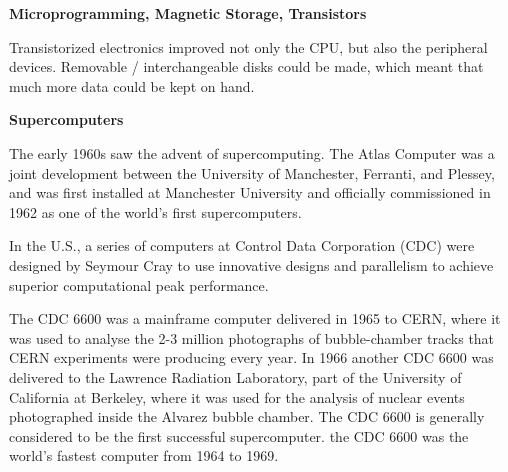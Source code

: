 \documentclass[12pt]{article}
\begin{document}
\vspace*{2em}
\noindent \textbf{Microprogramming, Magnetic Storage, Transistors}

Transistorized electronics improved not only the CPU, but also the peripheral devices. Removable / interchangeable disks could be made, which meant that much more data could be kept on hand.

\vspace*{2em}
\noindent \textbf{Supercomputers}

The early 1960s saw the advent of supercomputing. The Atlas Computer was a joint development between the University of Manchester, Ferranti, and Plessey, and was first installed at Manchester University and officially commissioned in 1962 as one of the world's first supercomputers.%

In the U.S., a series of computers at Control Data Corporation (CDC) were designed by Seymour Cray to use innovative designs and parallelism to achieve superior computational peak performance.

The CDC 6600 was a mainframe computer delivered in 1965 to CERN, where it was used to analyse the 2-3 million photographs of bubble-chamber tracks that CERN experiments were producing every year. In 1966 another CDC 6600 was delivered to the Lawrence Radiation Laboratory, part of the University of California at Berkeley, where it was used for the analysis of nuclear events photographed inside the Alvarez bubble chamber. The CDC 6600 is generally considered to be the first successful supercomputer. the CDC 6600 was the world's fastest computer from 1964 to 1969.
\end{document}
